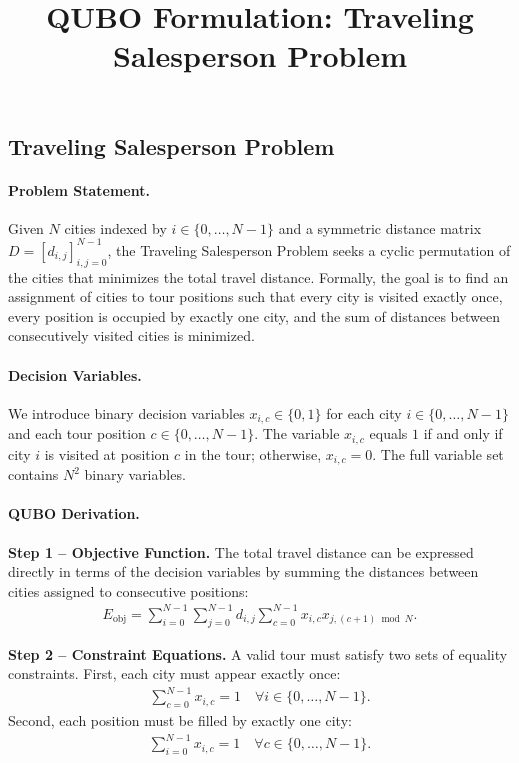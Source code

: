 \documentclass[12pt]{article}
\title{QUBO Formulation: Traveling Salesperson Problem}
\date{}
\begin{document}
\maketitle

\subsection*{Traveling Salesperson Problem}

\paragraph{Problem Statement.}
Given $N$ cities indexed by $i \in \{0, \dots, N-1\}$ and a symmetric distance matrix $D = [d_{i,j}]_{i,j=0}^{N-1}$, the Traveling Salesperson Problem seeks a cyclic permutation of the cities that minimizes the total travel distance. Formally, the goal is to find an assignment of cities to tour positions such that every city is visited exactly once, every position is occupied by exactly one city, and the sum of distances between consecutively visited cities is minimized.

\paragraph{Decision Variables.}
We introduce binary decision variables $x_{i,c} \in \{0,1\}$ for each city $i \in \{0, \dots, N-1\}$ and each tour position $c \in \{0, \dots, N-1\}$. The variable $x_{i,c}$ equals $1$ if and only if city $i$ is visited at position $c$ in the tour; otherwise, $x_{i,c} = 0$. The full variable set contains $N^2$ binary variables.

\paragraph{QUBO Derivation.}
\textbf{Step 1 -- Objective Function.} The total travel distance can be expressed directly in terms of the decision variables by summing the distances between cities assigned to consecutive positions:
\begin{align}
E_{\text{obj}} = \sum_{i=0}^{N-1} \sum_{j=0}^{N-1} d_{i,j} \sum_{c=0}^{N-1} x_{i,c} x_{j, (c+1) \bmod N}.
\end{align}

\textbf{Step 2 -- Constraint Equations.} A valid tour must satisfy two sets of equality constraints. First, each city must appear exactly once:
\begin{align}
\sum_{c=0}^{N-1} x_{i,c} = 1 \quad \forall i \in \{0, \dots, N-1\}.
\end{align}
Second, each position must be filled by exactly one city:
\begin{align}
\sum_{i=0}^{N-1} x_{i,c} = 1 \quad \forall c \in \{0, \dots, N-1\}.
\end{align}
\end{document}
